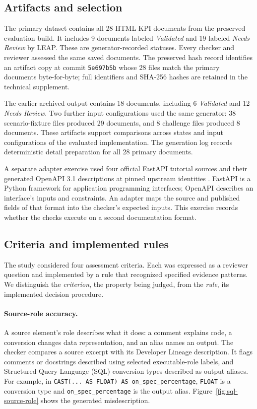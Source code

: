 \documentclass[a4paper,fleqn]{cas-dc}
\begin{document}
\subsection{Artifacts and selection}
The primary dataset contains all 28 HTML KPI documents from the preserved evaluation build. It includes 9 documents labeled \emph{Validated} and 19 labeled \emph{Needs Review} by LEAP. These are generator-recorded statuses. Every checker and reviewer assessed the same saved documents. The preserved hash record identifies an artifact copy at commit \texttt{5e697b5b} whose 28 files match the primary documents byte-for-byte; full identifiers and SHA-256 hashes are retained in the technical supplement.

The earlier archived output contains 18 documents, including 6 \emph{Validated} and 12 \emph{Needs Review}. Two further input configurations used the same generator: 38 scenario-fixture files produced 29 documents, and 8 challenge files produced 8 documents. These artifacts support comparisons across states and input configurations of the evaluated implementation. The generation log records deterministic detail preparation for all 28 primary documents.

A separate adapter exercise used four official FastAPI tutorial sources and their generated OpenAPI 3.1 descriptions at pinned upstream identities \citep{FastAPI2026,OpenAPI31}. FastAPI is a Python framework for application programming interfaces; OpenAPI describes an interface's inputs and constraints. An adapter maps the source and published fields of that format into the checker's expected inputs. This exercise records whether the checks execute on a second documentation format.

\subsection{Criteria and implemented rules}
The study considered four assessment criteria. Each was expressed as a reviewer question and implemented by a rule that recognized specified evidence patterns. We distinguish the \emph{criterion}, the property being judged, from the \emph{rule}, its implemented decision procedure.

\paragraph{Source-role accuracy.} A source element's role describes what it does: a comment explains code, a conversion changes data representation, and an alias names an output. The checker compares a source excerpt with its Developer Lineage description. It flags comments or docstrings described using selected executable-role labels, and Structured Query Language (SQL) conversion types described as output aliases. For example, in \texttt{CAST(... AS FLOAT) AS on\_spec\_percentage}, \texttt{FLOAT} is a conversion type and \texttt{on\_spec\_percentage} is the output alias. Figure~\ref{fig:sql-source-role} shows the generated misdescription.
\end{document}
